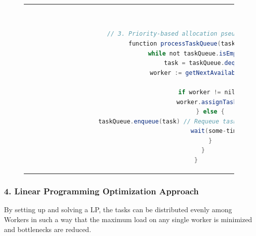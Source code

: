     \begin{figure}[htpb]
      \begin{tabular}{c}
      \ \small \begin{lstlisting}[language=Java]
        // 3. Priority-based allocation pseudocode
        function processTaskQueue(taskQueue) {
            while not taskQueue.isEmpty() {
                task = taskQueue.dequeue()
                worker := getNextAvailableWorker()
                
                if worker != nil {
                    worker.assignTask(task)
                } else {
                    taskQueue.enqueue(task) // Requeue task if no workers are available
                    wait(some-time)
                }
            }
        }
        \end{lstlisting}
      \end{tabular}
      \label{fig:priority-based-allocation}
    \end{figure}

\subsubsection{4. Linear Programming Optimization Approach}

By setting up and solving a \ac{LP}, the tasks can be distributed evenly among Workers in such a way that the maximum load on any single worker is minimized and bottlenecks are reduced.

